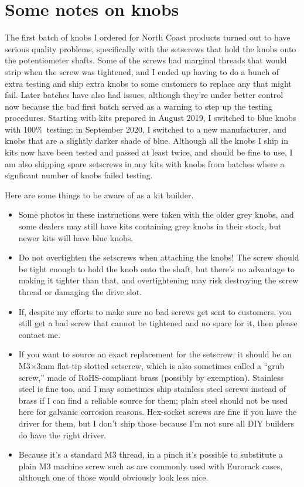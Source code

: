 \section{Some notes on knobs}

The first batch of knobs I ordered for North Coast products turned out to
have serious quality problems, specifically with the setscrews that hold the
knobs onto the potentiometer shafts.  Some of the screws had marginal
threads that would strip when the screw was tightened, and I ended up having
to do a bunch of extra testing and ship extra knobs to some customers to
replace any that might fail.  Later batches have also had issues, although
they're under better control now because the bad first batch served as a
warning to step up the testing procedures.  Starting with kits prepared in
August 2019, I switched to blue knobs with 100\%\ testing; in September
2020, I switched to a new manufacturer, and knobs that are a slightly darker
shade of blue.  Although all the knobs I ship in kits now have been tested
and passed at least twice, and should be fine to use, I am also shipping
spare setscrews in any kits with knobs from batches where a signficant
number of knobs failed testing.

Here are some things to be aware of as a kit builder.

\begin{itemize}
\item Some photos in these instructions were taken with the older grey
knobs, and some dealers may still have kits containing grey knobs in their
stock, but newer kits will have blue knobs.

\item Do not overtighten the setscrews when attaching the knobs!  The screw
should be tight enough to hold the knob onto the shaft, but there's no
advantage to making it tighter than that, and overtightening may risk
destroying the screw thread or damaging the drive slot.

\item If, despite my efforts to make sure no bad screws get sent to
customers, you still get a bad screw that cannot be tightened and no spare
for it, then please contact me.

\item If you want to source an exact replacement for the setscrew, it should
be an M3$\times$3mm flat-tip slotted setscrew, which is also sometimes
called a ``grub screw,'' made of RoHS-compliant brass (possibly by
exemption).  Stainless steel is fine too, and I may sometimes ship stainless
steel screws instead of brass if I can find a reliable source for them;
plain steel should not be used here for galvanic corrosion reasons. 
Hex-socket screws are fine if you have the driver for them, but I don't ship
those because I'm not sure all DIY builders do have the right driver.

\item Because it's a standard M3 thread, in a pinch it's possible to
substitute a plain M3 machine screw such as are commonly used with Eurorack
cases, although one of those would obviously look less nice.
\end{itemize}

